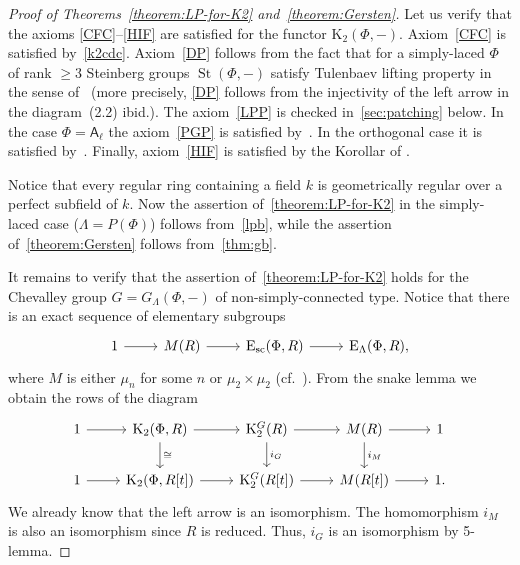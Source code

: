 \documentclass[oneside, 11pt]{amsart} \pdfoutput=1
\newcommand{\K}{{\mathrm{K}}}
\newcommand{\St}{\mathop{\mathrm{St}}\nolimits}
\newcommand{\E}{\mathrm{E}}
\numberwithin{equation}{section}
\theoremstyle{definition}
\newcommand{\rA}{\mathsf{A}}
\begin{document}
\begin{proof}[Proof of Theorems~\ref{theorem:LP-for-K2} and~\ref{theorem:Gersten}]
Let us verify that the axioms \ref{CFC}--\ref{HIF} are satisfied for the functor $\K_2(\Phi, -)$. Axiom~\ref{CFC} is satisfied by~\cref{k2cdc}. Axiom~\ref{DP} follows from the fact that for a simply-laced $\Phi$ of rank $\geq 3$ Steinberg groups $\St(\Phi, -)$ satisfy Tulenbaev lifting property in the sense of~\cite[Definition~2.1]{LS17} (more precisely, \ref{DP} follows from the injectivity of the left arrow in the diagram~(2.2) ibid.).
The axiom~\ref{LPP} is checked in~\cref{sec:patching} below.
In the case $\Phi = \rA_\ell$ the axiom~\ref{PGP} is satisfied by~\cite[Theorem~5.1]{Tu83}. In the orthogonal case it is satisfied by~\cite[Theorem~1]{LS20}. Finally, axiom~\ref{HIF} is satisfied by the Korollar of \cite[Satz~1]{Re75}.

Notice that every regular ring containing a field $k$ is geometrically regular over a perfect subfield of $k$. Now the assertion of~\cref{theorem:LP-for-K2} in the simply-laced case ($\Lambda = P(\Phi)$) follows from~\cref{lpb}, while the assertion of~\cref{theorem:Gersten} follows from~\cref{thm:gb}.

It remains to verify that the assertion of~\cref{theorem:LP-for-K2} holds for the Chevalley group $G = G_\Lambda(\Phi, -)$ of non-simply-connected type. Notice that there is an exact sequence of elementary subgroups
\begin{equation} \label{eq:E-seq} \begin{tikzcd} 1 \ar[r] & M(R) \ar[r] & \E_\mathrm{sc}(\Phi, R) \ar[r] & \E_\Lambda(\Phi, R), \end{tikzcd} \end{equation}
where $M$ is either $\mu_n$ for some $n$ or $\mu_2\times \mu_2$ (cf.~\cite[\S~3]{St67}).
From the snake lemma we obtain the rows of the diagram
\begin{equation}\label{eq:snake-A1} \begin{tikzcd} 
      1  \ar[r] & \K_2(\Phi, R)   \ar{d}{\cong} \ar[r]  & \K_2^G(R) \ar{d}{i_G} \ar[r] & M(R) \ar[r] \ar{d}{i_M} & 1 \\
      1  \ar[r] & \K_2(\Phi, R[t])\ar[r] & \K_2^G(R[t]) \ar[r] & M(R[t]) \ar[r] & 1.
    \end{tikzcd} \end{equation}
We already know that the left arrow is an isomorphism. The homomorphism $i_M$ is also an isomorphism since $R$ is reduced. Thus, $i_G$ is an isomorphism by 5-lemma.
\end{proof}
\end{document}
